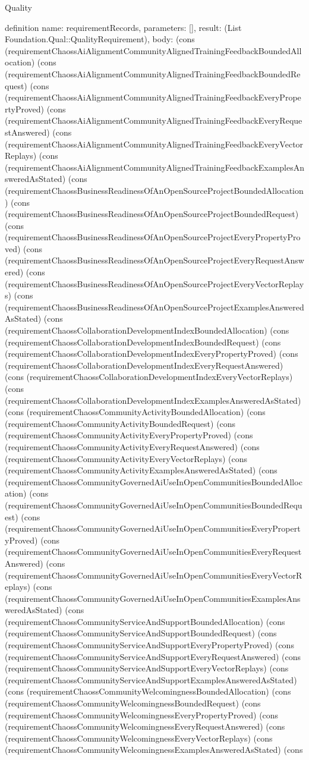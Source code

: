 \begin{lexlean}{Quality}
\begin{semanticmodule}
definition{
  name: requirementRecords,
  parameters: [],
  result: (List Foundation.Qual::QualityRequirement),
  body: (cons (requirementChaossAiAlignmentCommunityAlignedTrainingFeedbackBoundedAllocation) (cons (requirementChaossAiAlignmentCommunityAlignedTrainingFeedbackBoundedRequest) (cons (requirementChaossAiAlignmentCommunityAlignedTrainingFeedbackEveryPropertyProved) (cons (requirementChaossAiAlignmentCommunityAlignedTrainingFeedbackEveryRequestAnswered) (cons (requirementChaossAiAlignmentCommunityAlignedTrainingFeedbackEveryVectorReplays) (cons (requirementChaossAiAlignmentCommunityAlignedTrainingFeedbackExamplesAnsweredAsStated) (cons (requirementChaossBusinessReadinessOfAnOpenSourceProjectBoundedAllocation) (cons (requirementChaossBusinessReadinessOfAnOpenSourceProjectBoundedRequest) (cons (requirementChaossBusinessReadinessOfAnOpenSourceProjectEveryPropertyProved) (cons (requirementChaossBusinessReadinessOfAnOpenSourceProjectEveryRequestAnswered) (cons (requirementChaossBusinessReadinessOfAnOpenSourceProjectEveryVectorReplays) (cons (requirementChaossBusinessReadinessOfAnOpenSourceProjectExamplesAnsweredAsStated) (cons (requirementChaossCollaborationDevelopmentIndexBoundedAllocation) (cons (requirementChaossCollaborationDevelopmentIndexBoundedRequest) (cons (requirementChaossCollaborationDevelopmentIndexEveryPropertyProved) (cons (requirementChaossCollaborationDevelopmentIndexEveryRequestAnswered) (cons (requirementChaossCollaborationDevelopmentIndexEveryVectorReplays) (cons (requirementChaossCollaborationDevelopmentIndexExamplesAnsweredAsStated) (cons (requirementChaossCommunityActivityBoundedAllocation) (cons (requirementChaossCommunityActivityBoundedRequest) (cons (requirementChaossCommunityActivityEveryPropertyProved) (cons (requirementChaossCommunityActivityEveryRequestAnswered) (cons (requirementChaossCommunityActivityEveryVectorReplays) (cons (requirementChaossCommunityActivityExamplesAnsweredAsStated) (cons (requirementChaossCommunityGovernedAiUseInOpenCommunitiesBoundedAllocation) (cons (requirementChaossCommunityGovernedAiUseInOpenCommunitiesBoundedRequest) (cons (requirementChaossCommunityGovernedAiUseInOpenCommunitiesEveryPropertyProved) (cons (requirementChaossCommunityGovernedAiUseInOpenCommunitiesEveryRequestAnswered) (cons (requirementChaossCommunityGovernedAiUseInOpenCommunitiesEveryVectorReplays) (cons (requirementChaossCommunityGovernedAiUseInOpenCommunitiesExamplesAnsweredAsStated) (cons (requirementChaossCommunityServiceAndSupportBoundedAllocation) (cons (requirementChaossCommunityServiceAndSupportBoundedRequest) (cons (requirementChaossCommunityServiceAndSupportEveryPropertyProved) (cons (requirementChaossCommunityServiceAndSupportEveryRequestAnswered) (cons (requirementChaossCommunityServiceAndSupportEveryVectorReplays) (cons (requirementChaossCommunityServiceAndSupportExamplesAnsweredAsStated) (cons (requirementChaossCommunityWelcomingnessBoundedAllocation) (cons (requirementChaossCommunityWelcomingnessBoundedRequest) (cons (requirementChaossCommunityWelcomingnessEveryPropertyProved) (cons (requirementChaossCommunityWelcomingnessEveryRequestAnswered) (cons (requirementChaossCommunityWelcomingnessEveryVectorReplays) (cons (requirementChaossCommunityWelcomingnessExamplesAnsweredAsStated) (cons }
\end{semanticmodule}
\end{lexlean}
